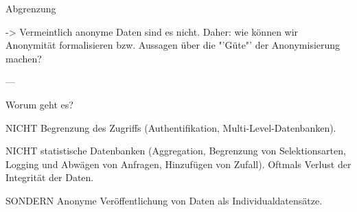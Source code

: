 \begin{frame}{Abgrenzung}

-> Vermeintlich anonyme Daten sind es nicht. Daher: wie können wir Anonymität formalisieren bzw. Aussagen über die "'Güte"' der Anonymisierung machen?

---

Worum geht es?

NICHT Begrenzung des Zugriffs (Authentifikation, Multi-Level-Datenbanken).
 
NICHT statistische Datenbanken (Aggregation, Begrenzung von Selektionsarten, Logging und Abwägen von Anfragen, Hinzufügen von Zufall). Oftmals Verlust der Integrität der Daten. 

SONDERN Anonyme Veröffentlichung von Daten als Individualdatensätze.

\end{frame}
